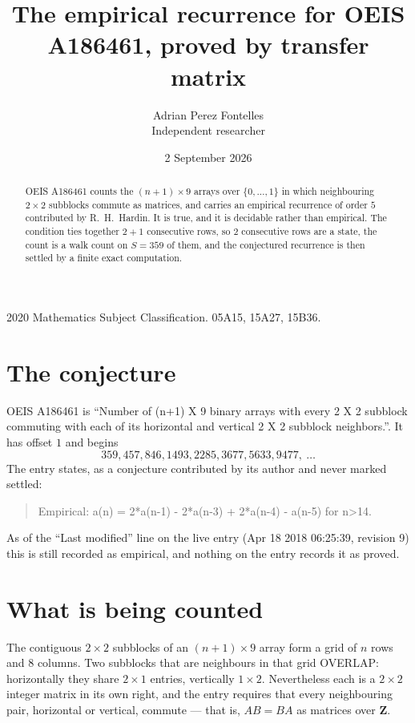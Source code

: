 \documentclass[11pt,a4paper]{article}
\title{The empirical recurrence for OEIS A186461, proved by transfer matrix}
\author{Adrian Perez Fontelles\\ \small Independent researcher}
\date{2 September 2026}
\theoremstyle{plain}
\theoremstyle{definition}
\begin{document}
\maketitle

\begin{abstract}
OEIS A186461 counts the $(n+1)\times9$ arrays over $\{0,\dots,1\}$ in which
neighbouring $2\times2$ subblocks commute as matrices, and carries an empirical recurrence
of order $5$ contributed by R.~H.~Hardin. It is true, and it is decidable rather than
empirical. The condition ties together $2+1$ consecutive rows, so $2$ consecutive rows are
a state, the count is a walk count on $S=359$ of them, and the conjectured recurrence is then
settled by a finite exact computation.
\end{abstract}

\noindent\small 2020 Mathematics Subject Classification. 05A15, 15A27, 15B36.\normalsize

\section{The conjecture}

OEIS A186461 is ``Number of (n+1) X 9 binary arrays with every 2 X 2 subblock commuting with each of its horizontal and vertical 2 X 2 subblock neighbors.''. It has offset $1$ and begins
\[
359, 457, 846, 1493, 2285, 3677, 5633, 9477,\ \dots
\]
The entry states, as a conjecture contributed by its author and never marked settled:
\begin{quote}
Empirical: a(n) = 2*a(n-1) - 2*a(n-3) + 2*a(n-4) - a(n-5) for n>14.
\end{quote}
As of the ``Last modified'' line on the live entry (Apr 18 2018 06:25:39, revision 9) this is still
recorded as empirical, and nothing on the entry records it as proved.

\section{What is being counted}

The contiguous $2\times2$ subblocks of an $(n+1)\times9$ array form a grid of $n$
rows and $8$ columns. Two subblocks that are neighbours in that
grid OVERLAP: horizontally they share $2\times1$ entries, vertically
$1\times2$. Nevertheless each is a $2\times2$ integer matrix in its own right, and
the entry requires that every neighbouring pair, horizontal or vertical, commute --- that is,
$AB=BA$ as matrices over $\mathbf{Z}$.
\end{document}
